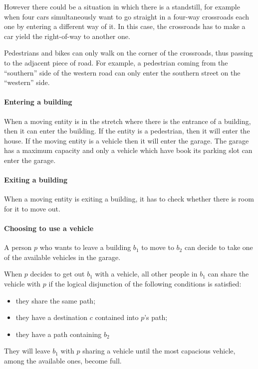 However there could be a situation in which there is a standstill,
for example when four cars simultaneously want to go straight in
a four-way crossroads each one by entering a different way of it.
In this case, the crossroads has to make a car yield the right-of-way
to another one.

Pedestrians and bikes can only walk on the corner of the crossroads, thus
passing to the adjacent piece of road.
For example, a pedestrian coming from the ``southern'' side of the
western road can only enter the southern street on the ``western'' side.

\paragraph{Entering a building}
When a moving entity is in the stretch where there is the entrance of a
building, then it can enter the building. If the entity is a pedestrian, then
it will enter the house. If the moving entity is a vehicle then it will
enter the garage. The garage has a maximum capacity and only a vehicle
which have book its parking slot can enter the garage.

\paragraph{Exiting a building}
When a moving entity is exiting a building, it has to check whether there is
room for it to move out.

\paragraph{Choosing to use a vehicle}
A person $p$ who wants to leave a building $b_1$ to move to $b_2$ can decide
to take one of the available vehicles in the garage.

When $p$ decides to get out $b_1$ with a vehicle,
all other people in $b_1$
can share the vehicle with $p$ if the logical disjunction
of the following conditions is satisfied:
\begin{itemize}
\item they share the same path;
\item they have a destination $c$ contained into $p$'s path;
\item they have a path containing $b_2$
\end{itemize}
They will leave $b_1$ with $p$ sharing a vehicle
until the most capacious vehicle, among the available ones, become full.

